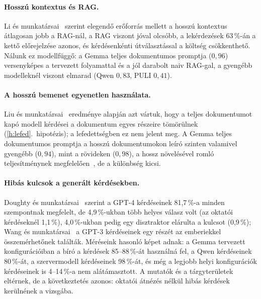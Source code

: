 \paragraph{Hosszú kontextus és RAG.} Li és munkatársai~\cite{li2024ragvslc} szerint elegendő erőforrás
mellett a hosszú kontextus átlagosan jobb a RAG-nál, a RAG viszont jóval olcsóbb, a lekérdezések 63\,\%-án a
kettő előrejelzése azonos, és kérdésenkénti útválasztással a költség csökkenthető. Nálunk ez modellfüggő: a
Gemma teljes dokumentumos promptja ($0{,}96$) versenyképes a tervezett folyamattal és a jól darabolt naiv
RAG-gal, a gyengébb modelleknél viszont elmarad (Qwen $0{,}83$, PULI $0{,}41$).

\paragraph{A hosszú bemenet egyenetlen használata.} Liu és munkatársai~\cite{liu2024lost} eredménye alapján
azt vártuk, hogy a teljes dokumentumot kapó modell kérdései a dokumentum egyes részeire tömörülnek
(\ref{h:lefed}.~hipotézis); a lefedettségben ez nem jelent meg. A Gemma teljes dokumentumos promptja a
hosszú dokumentumokon leíró szinten valamivel gyengébb ($0{,}94$), mint a rövideken ($0{,}98$), a hossz
növelésével romló teljesítménynek megfelelően~\cite{hsieh2024ruler}, de a különbség kicsi.

\paragraph{Hibás kulcsok a generált kérdésekben.} Doughty és munkatársai~\cite{doughty2024comparative}
szerint a GPT-4 kérdéseinek 81,7\,\%-a minden szempontnak megfelelt, de 4,9\,\%-ukban több helyes válasz
volt (az oktatói kérdéseknél 1,1\,\%), 4,0\,\%-ukban pedig egy disztraktor elárulta a kulcsot (0,9\,\%); Wang és
munkatársai~\cite{wang2022towards} a GPT-3 kérdéseinek egy részét az emberiekkel összemérhetőnek találták.
Méréseink hasonló képet adnak: a Gemma tervezett konfigurációiban a bíró a kérdések 85--88\,\%-át használná
fel, a Qwen  kérdéseinek 80\,\%-át, a szervermodell  kérdéseinek 98\,\%-át, és még a legjobb helyi
konfigurációk kérdéseinek is 4--14\,\%-a nem alátámasztott. A mutatók és a tárgyterületek eltérnek, de a
következtetés azonos: oktatói átnézés nélkül hibás kérdések kerülnének a vizsgába.

